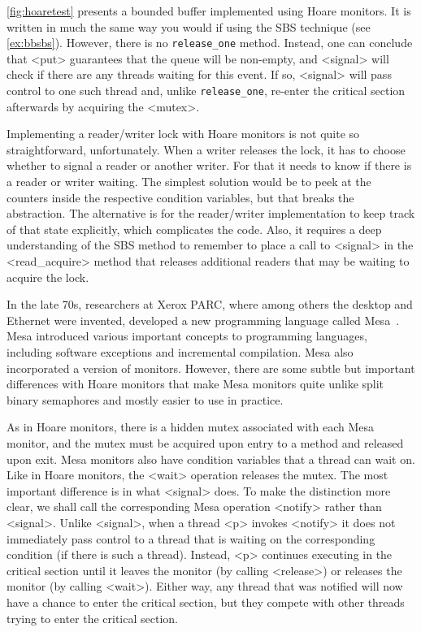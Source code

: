 \documentclass{report}
\begin{document}
\autoref{fig:hoaretest} presents a bounded buffer implemented using
Hoare monitors.
It is written in much the same way you would if using
the SBS technique (see \autoref{ex:bbsbs}).
However, there is no \texttt{release\_one} method.
Instead, one can conclude
that <{put}> guarantees that the queue will be non-empty, and
<{signal}> will check if there are any threads waiting for
this event.  If so, <{signal}> will pass control to one such thread
and, unlike \texttt{release\_one}, re-enter the critical
section afterwards by acquiring the <{mutex}>.

Implementing a reader/writer lock with Hoare monitors is not quite so
straightforward, unfortunately.  When a writer releases the lock, it
has to choose whether to signal a reader or another writer.  For that
it needs to know if there is a reader or writer waiting.  The simplest
solution would be to peek at the counters inside the respective condition
variables, but that breaks the abstraction.  The alternative is for the
reader/writer implementation to keep track of that state explicitly,
which complicates the code.  Also, it requires a deep understanding of
the SBS method to remember to place a call to <{signal}> in the
<{read_acquire}> method that releases additional readers that
may be waiting to acquire the lock.

In the late 70s, researchers at Xerox PARC,
where among others the desktop and Ethernet
were invented, developed a new programming language called
Mesa~\cite{LR80}.
%
Mesa introduced various important concepts to programming languages,
including software exceptions and incremental compilation.  Mesa also
incorporated a version of monitors.
However, there are some subtle but important differences with Hoare
monitors that make Mesa monitors quite unlike split binary semaphores
and mostly easier to use in practice.

As in Hoare monitors, there is a hidden mutex associated with each Mesa monitor,
and the mutex must be acquired upon entry to a method and released
upon exit.
Mesa monitors also have condition variables that a thread can wait on.
Like in Hoare monitors, the <{wait}> operation releases the mutex.
The most important difference is in what <{signal}> does.
To make the distinction more clear, we shall call the corresponding Mesa
operation <{notify}> rather than <{signal}>.
%
Unlike <{signal}>, when a thread <{p}> invokes <{notify}>
it does not immediately pass 
control to a thread that is waiting on the corresponding condition (if there
is such a thread).  Instead, <{p}> continues executing in the critical section
until it leaves the monitor (by calling <{release}>) or
releases the monitor (by calling <{wait}>).
Either way, any thread that was notified will now have a chance to enter
the critical section, but they compete
with other threads trying to enter the critical section.
\end{document}
